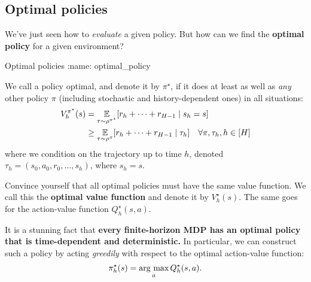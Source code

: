 \documentclass[\main/main]{subfiles}
\begin{document}
\subsection{Optimal policies}

We've just seen how to \emph{evaluate} a given policy. But how can we find the \textbf{optimal policy} for a given environment?

\begin{definition}{Optimal policies}
:name: optimal_policy

    We call a policy optimal, and denote it by $\pi^\star$, if it does at least as well as \emph{any} other policy $\pi$ (including stochastic and history-dependent ones) in all situations:
    \begin{equation}
        \begin{aligned}
            V_h^{\pi^\star}(s) &= \operatorname*{\mathbb{E}}_{\tau \sim \rho^{\pi^{\star}}}[r_h + \cdots + r_{H-1} \mid s_h = s] \\
            &\ge \operatorname*{\mathbb{E}}_{\tau \sim \rho^{\pi}}[r_h + \cdots + r_{H-1} \mid \tau_h] \quad \forall \pi, \tau_h, h \in [H]
        \end{aligned}
        \label{eq:optimal_policy_finite}
    \end{equation}
    where we condition on the trajectory up to time $h$, denoted $\tau_h = (s_0, a_0, r_0, \dots, s_h)$, where $s_h = s$.
\end{definition}

Convince yourself that all optimal policies must have the same value function. We call this the \textbf{optimal value function} and denote it by $V_h^\star(s)$. The same goes for the action-value function $Q_h^\star(s, a)$.

It is a stunning fact that \textbf{every finite-horizon MDP has an optimal policy that is time-dependent and deterministic.} In particular, we can construct such a policy by acting \emph{greedily} with respect to the optimal action-value function:
\[
    \pi_h^\star(s) = \operatorname*{\textrm{arg\ max}}_a Q_h^\star(s, a).
\]
\end{document}
